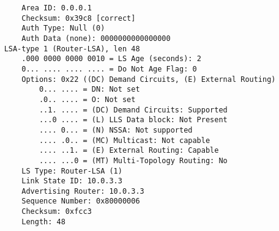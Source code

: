 \begin{lstlisting}
        Area ID: 0.0.0.1
        Checksum: 0x39c8 [correct]
        Auth Type: Null (0)
        Auth Data (none): 0000000000000000
    LSA-type 1 (Router-LSA), len 48
        .000 0000 0000 0010 = LS Age (seconds): 2
        0... .... .... .... = Do Not Age Flag: 0
        Options: 0x22 ((DC) Demand Circuits, (E) External Routing)
            0... .... = DN: Not set
            .0.. .... = O: Not set
            ..1. .... = (DC) Demand Circuits: Supported
            ...0 .... = (L) LLS Data block: Not Present
            .... 0... = (N) NSSA: Not supported
            .... .0.. = (MC) Multicast: Not capable
            .... ..1. = (E) External Routing: Capable
            .... ...0 = (MT) Multi-Topology Routing: No
        LS Type: Router-LSA (1)
        Link State ID: 10.0.3.3
        Advertising Router: 10.0.3.3
        Sequence Number: 0x80000006
        Checksum: 0xfcc3
        Length: 48
\end{lstlisting}

